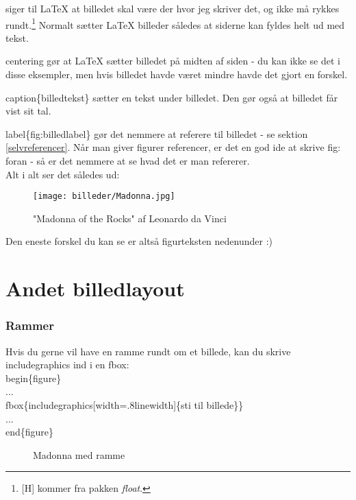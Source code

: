 \noindent
[H] siger til LaTeX at billedet skal være der hvor jeg skriver det, og ikke må rykkes rundt.\footnote{[H] kommer fra pakken \emph{float}.} Normalt sætter LaTeX billeder således at siderne kan fyldes helt ud med tekst.

\noindent
\bs centering gør at LaTeX sætter billedet på midten af siden - du kan ikke se det i disse eksempler, men hvis billedet havde været mindre havde det gjort en forskel.

\noindent
\bs caption\{billedtekst\} sætter en tekst under billedet. Den gør også at billedet får vist sit tal.

\noindent
\bs label\{fig:billedlabel\} gør det nemmere at referere til billedet - se sektion  \ref{selvreferencer}. Når man giver figurer referencer, er det en god ide at skrive fig: foran - så er det nemmere at se hvad det er man refererer.\\

\noindent
Alt i alt ser det således ud:

\begin{figure}[H]
\centering
\texttt{[image: billeder/Madonna.jpg]}
\caption{"Madonna of the Rocks" af Leonardo da Vinci}
\label{fig:madonna_standard}
\end{figure}

\noindent
Den eneste forskel du kan se er altså figurteksten nedenunder :)

\section{Andet billedlayout}
\subsubsection{Rammer}
Hvis du gerne vil have en ramme rundt om et billede, kan du skrive \bs includegraphics ind i en \bs fbox:\\

\indent \bs begin\{figure\}\\
\indent ... \\
\indent \bs fbox\{\bs includegraphics[width=.8\bs linewidth]\{sti til billede\}\}\\
\indent ... \\
\indent \bs end\{figure\}\\

\begin{figure}[H]
\centering
{}
\caption{Madonna med ramme}
\label{fig:madonna_ramme}
\end{figure}

